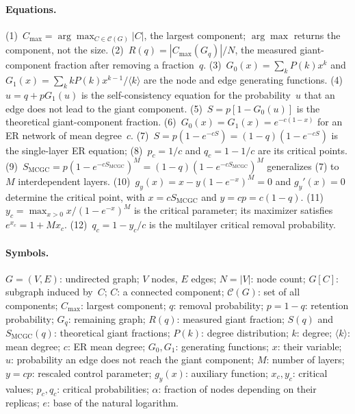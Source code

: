 \documentclass[11pt]{article}
\begin{document}
\paragraph{Equations.}
(1)~$C_{\max}=\arg\max_{C\in\mathcal C(G)}|C|$, the largest component; $\arg\max$ returns the component, not the size.
(2)~$R(q)=|C_{\max}(G_q)|/N$, the measured giant-component fraction after removing a fraction~$q$.
(3)~$G_0(x)=\sum_kP(k)x^k$ and $G_1(x)=\sum_k kP(k)x^{k-1}/\langle k\rangle$ are the node and edge generating functions.
(4)~$u=q+pG_1(u)$ is the self-consistency equation for the probability~$u$ that an edge does not lead to the giant component.
(5)~$S=p[1-G_0(u)]$ is the theoretical giant-component fraction.
(6)~$G_0(x)=G_1(x)=e^{-c(1-x)}$ for an ER network of mean degree~$c$.
(7)~$S=p(1-e^{-cS})=(1-q)(1-e^{-cS})$ is the single-layer ER equation; (8)~$p_c=1/c$ and $q_c=1-1/c$ are its critical points.
(9)~$S_{\mathrm{MCGC}}=p(1-e^{-cS_{\mathrm{MCGC}}})^M=(1-q)(1-e^{-cS_{\mathrm{MCGC}}})^M$ generalizes (7) to $M$ interdependent layers.
(10)~$g_y(x)=x-y(1-e^{-x})^M=0$ and $g_y'(x)=0$ determine the critical point, with $x=cS_{\mathrm{MCGC}}$ and $y=cp=c(1-q)$.
(11)~$y_c=\max_{x>0}x/(1-e^{-x})^M$ is the critical parameter; its maximizer satisfies $e^{x_c}=1+Mx_c$.
(12)~$q_c=1-y_c/c$ is the multilayer critical removal probability.

\paragraph{Symbols.}
$G=(V,E)$: undirected graph; $V$ nodes, $E$ edges; $N=|V|$: node count; $G[C]$: subgraph induced by~$C$; $C$: a connected component; $\mathcal C(G)$: set of all components; $C_{\max}$: largest component; $q$: removal probability; $p=1-q$: retention probability; $G_q$: remaining graph; $R(q)$: measured giant fraction; $S(q)$ and $S_{\mathrm{MCGC}}(q)$: theoretical giant fractions; $P(k)$: degree distribution; $k$: degree; $\langle k\rangle$: mean degree; $c$: ER mean degree; $G_0,G_1$: generating functions; $x$: their variable; $u$: probability an edge does not reach the giant component; $M$: number of layers; $y=cp$: rescaled control parameter; $g_y(x)$: auxiliary function; $x_c,y_c$: critical values; $p_c,q_c$: critical probabilities; $\alpha$: fraction of nodes depending on their replicas; $e$: base of the natural logarithm.
\end{document}
